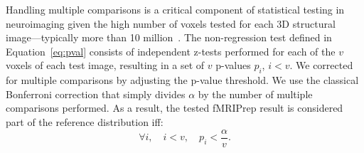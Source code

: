 \documentclass{article}
\newcommand{\fmriprep}{fMRIPrep\xspace}
\begin{document}
Handling multiple comparisons is a critical component of statistical testing in neuroimaging given the high number of voxels tested for each 3D structural image---typically more than 10 million~\cite{NICHOLS2007246}. The non-regression test defined in Equation~\ref{eq:pval} consists of independent z-tests performed for each of the $v$ voxels of each test image, resulting in a set of $v$ p-values $p_i$, $i < v$. We corrected for multiple comparisons by adjusting the p-value threshold. We use the classical Bonferroni correction that simply divides $\alpha$ by the number of multiple comparisons performed. As a result, the tested \fmriprep result is considered part of the reference distribution iff:
\begin{equation}
    \label{eq:bonferroni}
    \forall i, \quad i < v, \quad p_i < \frac{\alpha}{v}.
\end{equation}
\end{document}
